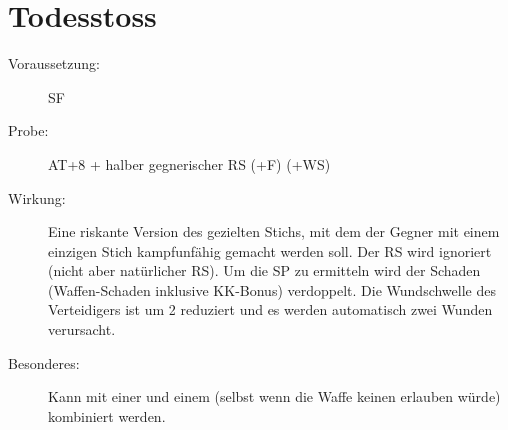 \section{Todesstoss}
\label{bAT.todesstoss}
\begin{description}
    \item[Voraussetzung:]
        SF 
    \item[Probe:]
        AT+8 + halber gegnerischer RS (+F) (+WS)
    \item[Wirkung:]
        Eine riskante Version des gezielten Stichs, mit dem der Gegner mit einem einzigen Stich kampfunfähig gemacht werden soll.
        Der RS wird ignoriert (nicht aber natürlicher RS).
        Um die SP zu ermitteln wird der Schaden (Waffen-Schaden inklusive KK-Bonus) verdoppelt.
        Die Wundschwelle des Verteidigers ist um 2 reduziert und es werden automatisch zwei Wunden verursacht.
    \item[Besonderes:]
        Kann mit einer  und einem  (selbst wenn die Waffe keinen  erlauben würde) kombiniert werden.
\end{description}
